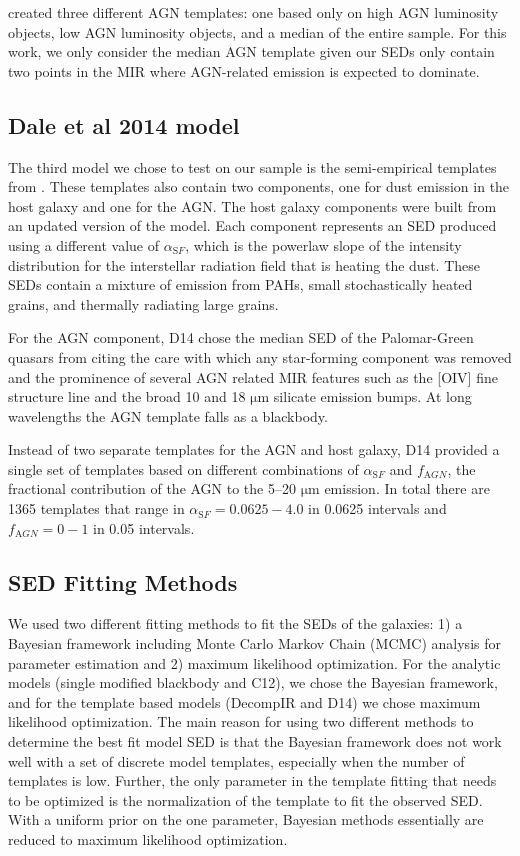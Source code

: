 \documentclass[fleqn,usenatbib]{mnras}
\newcommand{\um}{$\mathrm{\mu}$m}
\begin{document}
\citet{Mullaney:2011yq} created three different AGN templates: one based only on high AGN luminosity objects, low AGN luminosity objects, and a median of the entire sample. For this work, we only consider the median AGN template given our SEDs only contain two points in the MIR where AGN-related emission is expected to dominate. 

\subsection{Dale et al 2014 model}
The third model we chose to test on our sample is the semi-empirical templates from \citet[][hereafter D14]{Dale:2014yq}. These templates also contain two components, one for dust emission in the host galaxy and one for the AGN. The host galaxy components were built from an updated version of the \citet{Dale:2002ty} model. Each component represents an SED produced using a different value of $\alpha_{\mathrm SF}$, which is the powerlaw slope of the intensity distribution for the interstellar radiation field that is heating the dust. These SEDs contain a mixture of emission from PAHs, small stochastically heated grains, and thermally radiating large grains.

For the AGN component, D14 chose the median SED of the Palomar-Green quasars from \citet{Shi:2013vn} citing the care with which any star-forming component was removed and the prominence of several AGN related MIR features such as the [OIV] fine structure line and the broad 10 and 18 \um{} silicate emission bumps. At long wavelengths the AGN template falls as a blackbody.

Instead of two separate templates for the AGN and host galaxy, D14 provided a single set of templates based on different combinations of $\alpha_{\mathrm SF}$ and $f_{\mathrm AGN}$, the fractional contribution of the AGN to the 5--20 \um{} emission. In total there are 1365 templates that range in $\alpha_{\mathrm SF}=0.0625-4.0$ in 0.0625 intervals and $f_{\mathrm AGN} = 0-1$ in 0.05 intervals.

\subsection{SED Fitting Methods}
We used two different fitting methods to fit the SEDs of the galaxies: 1) a Bayesian framework including Monte Carlo Markov Chain (MCMC) analysis for parameter estimation and 2) maximum likelihood optimization. For the analytic models (single modified blackbody and C12), we chose the Bayesian framework, and for the template based models (DecompIR and D14) we chose maximum likelihood optimization. The main reason for using two different methods to determine the best fit model SED is that the Bayesian framework does not work well with a set of discrete model templates, especially when the number of templates is low. Further, the only parameter in the template fitting that needs to be optimized is the normalization of the template to fit the observed SED. With a uniform prior on the one parameter, Bayesian methods essentially are reduced to maximum likelihood optimization.
\end{document}
